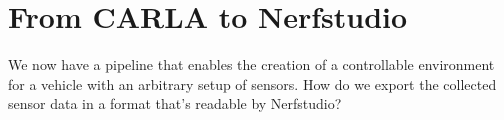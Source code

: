 \begin{comment}
    
\begin{algorithmic}[1]
\Function{run\_carla\_session}{experiment\_settings}
    \State \textbf{create a directory} for the experiment and save experiment settings to a file
    \State \textbf{create a SLURM script} for the experiment
    \State \textbf{spawn an ego vehicle} and set up the traffic manager
    \State \textbf{create cameras} based on the specified camera rigs and rig file
    \State \textbf{create a TransformFile} to store the image and camera pose data
    \While{\textbf{stop criteria has not been met}}
        \State \textbf{tick the CARLA world}
        \State \textbf{get images} from all mounted cameras and stack them horizontally
        \State \textbf{show the image}
        \State \textbf{store the image and camera pose data} every n-th tick
        \State \textbf{update the distance traveled} using euclidean distance
    \EndWhile
    \State \textbf{export the TransformFile} and destroy the actors
\EndFunction
\end{algorithmic}

\end{comment}











\section{From CARLA to Nerfstudio} \label{sec:carla-to-nerfstudio}
\begin{comment}
Premise: Have collected data from CARLA.
Question: How do I get it from CARLA to Nerfstudio in a usable format?

\begin{itemize}
    \item Use the CARLA-simulator to find out which camera and vehicle settings work the best for capturing data for NeRFs.
    \item In order to do that I need to collect data from CARLA and convert it into a format that's usable by Nerfstudio.
\end{itemize}
\end{comment}

We now have a pipeline that enables the creation of a controllable environment for a vehicle with an arbitrary setup of sensors. How do we export the collected sensor data in a format that's readable by Nerfstudio?


